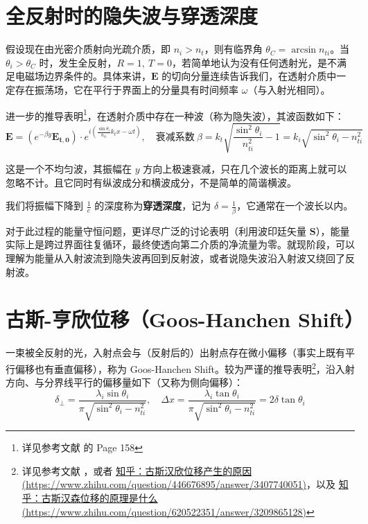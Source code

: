 \documentclass[UTF8]{report}
\theoremstyle{MyLineTheoremStyle} %
\theoremstyle{MyBlockTheoremStyle} %
\theoremstyle{MySubsubsectionStyle} %
\begin{document}
\section{全反射时的隐失波与穿透深度}

假设现在由光密介质射向光疏介质，即 $n_i > n_t$，则有临界角 $\theta_C = \arcsin n_{ti}$。当 $\theta_i > \theta_C$ 时，发生全反射，$R = 1,\ T = 0$，若简单地认为没有任何透射光，是不满足电磁场边界条件的。具体来讲，$\boldsymbol{E}$ 的切向分量连续告诉我们，在透射介质中一定存在振荡场，它在平行于界面上的分量具有时间频率 $\omega$（与入射光相同）。

进一步的推导表明\footnote{详见参考文献 \cite{Optics} 的 Page 158}，在透射介质中存在一种波（称为隐失波），其波函数如下：
\begin{equation}
\boldsymbol{E} = \left( e^{-\beta y} \boldsymbol{E_{t,0}}\right)\cdot e^{i\left( \frac{\sin \theta_i}{n_{ti}}  k_t x - \omega t \right)},\quad \text{衰减系数}\  \beta = k_t \sqrt{\frac{\sin^2 \theta_i}{n_{ti}^2} - 1} = k_i\sqrt{\sin^2 \theta_i - n_{ti}^2} 
\end{equation}

这是一个不均匀波，其振幅在 $y$ 方向上极速衰减，只在几个波长的距离上就可以忽略不计。且它同时有纵波成分和横波成分，不是简单的简谐横波。

我们将振幅下降到 $\frac{1}{e}$ 的深度称为\textbf{穿透深度}，记为 $\delta = \frac{1}{\beta} $，它通常在一个波长以内。

对于此过程的能量守恒问题，更详尽广泛的讨论表明（利用波印廷矢量 $\boldsymbol{S}$），能量实际上是跨过界面往复循环，最终使透向第二介质的净流量为零。就现阶段，可以理解为能量从入射波流到隐失波再回到反射波，或者说隐失波沿入射波又绕回了反射波。

\section{古斯-亨欣位移（Goos-Hanchen Shift）}

一束被全反射的光，入射点会与（反射后的）出射点存在微小偏移（事实上既有平行偏移也有垂直偏移），称为 Goos-Hanchen Shift。较为严谨的推导表明\footnote{详见参考文献 \cite{GHShift}，或者 \href{https://www.zhihu.com/question/446676895/answer/3407740051}{知乎：古斯汉欣位移产生的原因 (https://www.zhihu.com/question/446676895/answer/3407740051)}，以及 \href{https://www.zhihu.com/question/620522351/answer/3209865128}{知乎：古斯汉森位移的原理是什么 (https://www.zhihu.com/question/620522351/answer/3209865128)}}，沿入射方向、与分界线平行的偏移量如下（又称为侧向偏移）：
\begin{equation}
\delta_{\perp} = \frac{\lambda_i \sin \theta_i}{\pi \sqrt{\sin^2 \theta_i - n_{ti}^2} },\quad \Delta x =  \frac{\lambda_i \tan \theta_i}{\pi \sqrt{\sin^2 \theta_i - n_{ti}^2} } = 2 \delta \tan \theta_i 
\end{equation}
\end{document}
